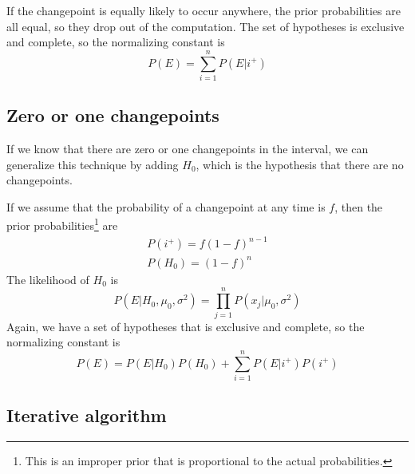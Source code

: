 \documentclass[twocolumn,11pt]{article}
\begin{document}
If the changepoint is equally likely to occur anywhere, the prior
probabilities are all equal, so they drop out of the computation.
The set of hypotheses is exclusive and complete, so the normalizing
constant is
%
\begin{equation}
P(E) = \sum_{i=1}^n P(E|i^+)
\end{equation}


\subsection{Zero or one changepoints}
\label{likefun0}

If we know that there are zero or one changepoints
in the interval, we can generalize this technique by adding
$H_0$, which is the hypothesis that there are no changepoints.

If we assume that the probability of a changepoint at any time is $f$,
then the prior probabilities\footnote{This is an improper
prior that is proportional to the actual probabilities.} are
%
\begin{equation}
\begin{gathered}
P(i^+) = f (1-f)^{n-1} \\
P(H_0) = (1-f)^n
\end{gathered}
\end{equation}
%
The likelihood of $H_0$ is
%
\begin{equation}
P(E|H_0,\mu_0, \sigma^2) = \prod_{j=1}^{n} P(x_j | \mu_0, \sigma^2) 
\end{equation}
%
Again, we have a set of hypotheses that is 
exclusive and complete, so the normalizing constant is
%
\begin{equation}
P(E) = P(E|H_0) P(H_0) + \sum_{i=1}^n P(E|i^+) P(i^+)
\end{equation}
%


\subsection{Iterative algorithm}
\end{document}
